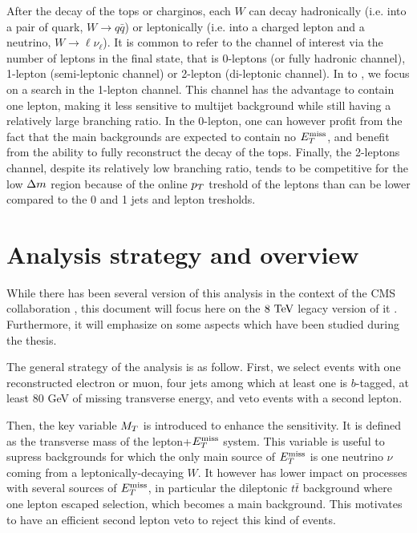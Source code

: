     After the decay of the tops or charginos, each $W$ can decay hadronically (i.e. into
    a pair of quark, $W \rightarrow q\bar{q}$) or leptonically (i.e. into a charged
    lepton and a neutrino, $W \rightarrow \ell \nu_{\ell}$). It is common to refer to
    the channel of interest via the number of leptons in the final state, that is 0-leptons
    (or fully hadronic channel), 1-lepton (semi-leptonic channel) or 2-lepton (di-leptonic
    channel). In  to , we focus on
    a search in the 1-lepton channel. This channel has the advantage to contain one
    lepton, making it less sensitive to multijet background while still having a relatively
    large branching ratio. In the 0-lepton, one can however profit from the fact that
    the main backgrounds are expected to contain no $E_T^\text{miss}$, and benefit from the ability
    to fully reconstruct the decay of the tops. Finally, the 2-leptons channel, despite
    its relatively low branching ratio, tends to be competitive for the low $\Delta m$
    region because of the online $p_T$ treshold of the leptons than can be lower compared
    to the 0 and 1 jets and lepton tresholds.

    \section{Analysis strategy and overview \label{sec:analysis_overview}}

    While there has been several version of this analysis in the context of the CMS
    collaboration \cite{SUS-12-023-PAS, SUS-13-011-PUB, SUS-14-015-PAS}, this document
    will focus here on the $8~\text{TeV}$ legacy version of it \cite{SUS-14-015-PAS}. Furthermore,
    it will emphasize on some aspects which have been studied during the thesis.

    The general strategy of the analysis is as follow. First, we select events with one
    reconstructed electron or muon, four jets among which at least one is $b$-tagged,
    at least 80 GeV of missing transverse energy, and veto events with a second lepton.

    Then, the key variable $M_T$ is introduced to enhance the sensitivity. It is defined as
    the transverse mass of the lepton+$E_T^\text{miss}$ system. This variable is useful to supress
    backgrounds for which the only main source of $E_T^\text{miss}$ is one neutrino $\nu$
    coming from a leptonically-decaying $W$. It however has lower impact on processes with
    several sources of $E_T^\text{miss}$, in particular the dileptonic $t\bar{t}$ background where one
    lepton escaped selection, which becomes a main background. This motivates to have an
    efficient second lepton veto to reject this kind of events.

